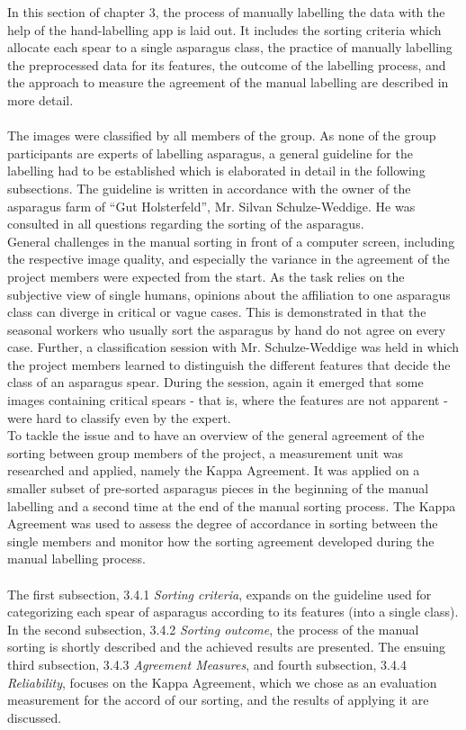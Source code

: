 In this section of chapter 3, the process of manually labelling the data with the help of the hand-labelling app is laid out. It includes the sorting criteria which allocate each spear to a single asparagus class, the practice of manually labelling the preprocessed data for its features, the outcome of the labelling process, and the approach to measure the agreement of the manual labelling are described in more detail. \\
\\
The images were classified by all members of the group. As none of the group participants are experts of labelling asparagus, a general guideline for the labelling had to be established which is elaborated in detail in the following subsections. The guideline is written in accordance with the owner of the asparagus farm of “Gut Holsterfeld”, Mr. Silvan Schulze-Weddige. He was consulted in all questions regarding the sorting of the asparagus. \\
General challenges in the manual sorting in front of a computer screen, including the respective image quality, and especially the variance in the agreement of the project members were expected from the start. As the task relies on the subjective view of single humans, opinions about the affiliation to one asparagus class can diverge in critical or vague cases.  This is demonstrated in that the seasonal workers who usually sort the asparagus by hand do not agree on every case. Further, a classification session with Mr. Schulze-Weddige was held in which the project members learned to distinguish the different features that decide the class of an asparagus spear. During the session, again it emerged that some images containing critical spears - that is, where the features are not apparent - were hard to classify even by the expert. \\
To tackle the issue and to have an overview of the general agreement of the sorting between group members of the project, a measurement unit was researched and applied, namely the Kappa Agreement. It was applied on a smaller subset of pre-sorted asparagus pieces in the beginning of the manual labelling and a second time at the end of the manual sorting process. The Kappa Agreement was used to assess the degree of accordance in sorting between the single members and monitor how the sorting agreement developed during the manual labelling process. \\
\\
The first subsection, 3.4.1 \textit{Sorting criteria}, expands on the guideline used for categorizing each spear of asparagus according to its features (into a single class).
In the second subsection, 3.4.2 \textit{Sorting outcome}, the process of the manual sorting is shortly described and the achieved results are presented.
The ensuing third subsection, 3.4.3 \textit{Agreement Measures}, and fourth subsection, 3.4.4 \textit{Reliability}, focuses on the Kappa Agreement, which we chose as an evaluation measurement for the accord of our sorting, and the results of applying it are discussed.


